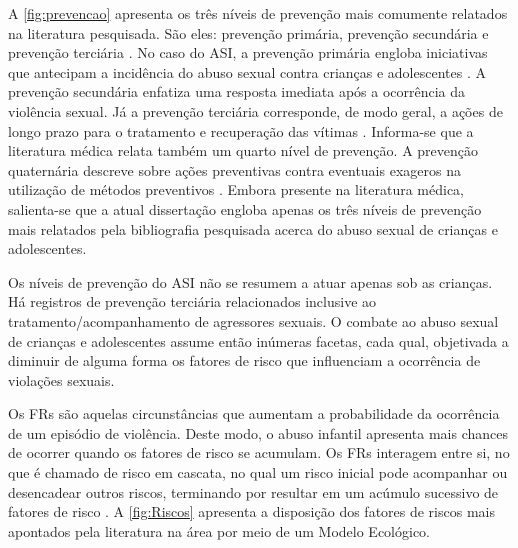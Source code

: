A \autoref{fig:prevencao} apresenta os três níveis de prevenção mais comumente relatados na literatura pesquisada. São eles: prevenção primária, prevenção secundária e prevenção terciária \cite{dahlberg2006violencia, santos2011guia, maria2012abusos, cardoso2015abuso}. No caso do \ac{ASI}, a prevenção primária engloba iniciativas que antecipam a incidência do abuso sexual contra crianças e adolescentes  \cite{marcelino2017vamos}. A prevenção secundária enfatiza uma resposta imediata após a ocorrência da violência sexual. Já a prevenção terciária corresponde, de modo geral, a ações de longo prazo para o tratamento e recuperação das vítimas \cite{escocia2020expert}. Informa-se que a literatura médica relata também um quarto nível de prevenção. A prevenção quaternária descreve sobre ações preventivas contra eventuais exageros na utilização de métodos preventivos \cite{tesser2017importante}. Embora presente na literatura médica, salienta-se que a atual dissertação engloba apenas os três níveis de prevenção mais relatados pela bibliografia pesquisada acerca do abuso sexual de crianças e adolescentes.

Os níveis de prevenção do \ac{ASI} não se resumem a atuar apenas sob as crianças. Há registros de prevenção terciária relacionados inclusive ao tratamento/acompanhamento de agressores sexuais. O combate ao abuso sexual de crianças e adolescentes assume então inúmeras facetas, cada qual, objetivada a diminuir de alguma forma os fatores de risco que influenciam a ocorrência de violações sexuais.

Os \acfp{FR} são aquelas circunstâncias que aumentam a probabilidade da ocorrência de um episódio de violência. Deste modo, o abuso infantil apresenta mais chances de ocorrer quando os fatores de risco se acumulam. Os \acp{FR} interagem entre si, no que é chamado de risco em cascata, no qual um risco inicial pode acompanhar ou desencadear outros riscos, terminando por resultar em um acúmulo sucessivo de fatores de risco \cite{Recommendations2019Taylor}. A \autoref{fig:Riscos} apresenta a disposição dos fatores de riscos mais apontados pela literatura na área por meio de um Modelo Ecológico. 

\pagebreak

